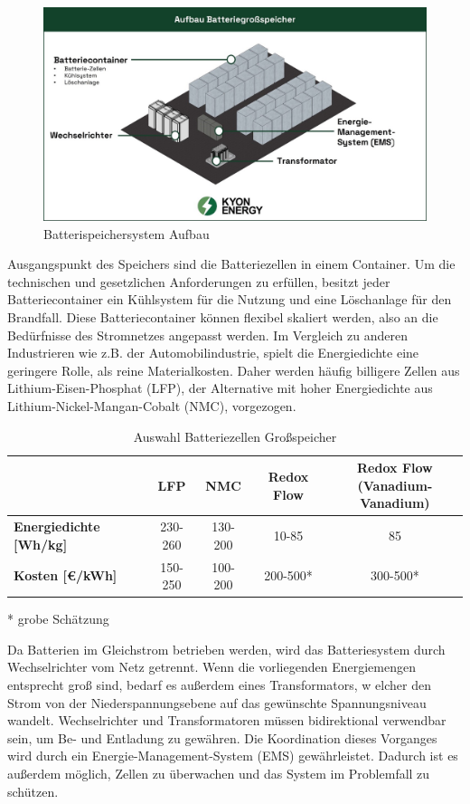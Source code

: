 \begin{figure}[h!]
    \centering
    \includegraphics[width=14cm]{Abbildungen/StandDerTechnikAbb4jpg.jpg}
    \caption{Batterispeichersystem Aufbau\cite{kyon-energy}}\label{fig:Batterispeichersystem_Aufbau}
\end{figure}

Ausgangspunkt des Speichers sind die Batteriezellen in einem Container. 
Um die technischen und gesetzlichen Anforderungen zu erfüllen, besitzt jeder Batteriecontainer ein Kühlsystem für die Nutzung und eine Löschanlage für den Brandfall. 
Diese Batteriecontainer können flexibel skaliert werden, also an die Bedürfnisse des Stromnetzes angepasst werden. 
Im Vergleich zu anderen Industrieren wie z.B. der Automobilindustrie, spielt die Energiedichte eine geringere Rolle, als reine Materialkosten. 
Daher werden häufig billigere Zellen aus Lithium-Eisen-Phosphat (LFP), der Alternative mit hoher Energiedichte aus Lithium-Nickel-Mangan-Cobalt (NMC), vorgezogen.

\begin{table}[htbp]
    \centering
    \caption{Auswahl Batteriezellen Großspeicher\cite{poworks-comparison}}
    \label{tab:Auswahl_Batteriezellen_Großspeicher}
    \begin{tabular}{lcccc}
       \toprule
        & \textbf{LFP} & \textbf{NMC} & \textbf{Redox Flow} & \textbf{Redox Flow\\ (Vanadium-Vanadium)} \\
        \midrule
        \textbf{Energiedichte [Wh/kg]} & 230-260 & 130-200 & 10-85 & 85 \\
        \textbf{Kosten [€/kWh]} & 150-250 & 100-200 & 200-500* & 300-500* \\
        \bottomrule
    \end{tabular}
\end{table}

* grobe Schätzung

Da Batterien im Gleichstrom betrieben werden, wird das Batteriesystem durch Wechselrichter vom Netz getrennt. 
Wenn die vorliegenden Energiemengen entsprecht groß sind, bedarf es außerdem eines Transformators, w
elcher den Strom von der Niederspannungsebene auf das gewünschte Spannungsniveau wandelt. 
Wechselrichter und Transformatoren müssen bidirektional verwendbar sein, um Be- und Entladung zu gewähren. 
Die Koordination dieses Vorganges wird durch ein Energie-Management-System (EMS) gewährleistet. 
Dadurch ist es außerdem möglich, Zellen zu überwachen und das System im Problemfall zu schützen\cite{kyon-energy}.

